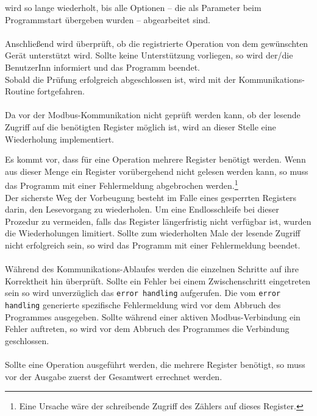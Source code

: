 \documentclass[Bachelorarbeit.tex]{subfiles}
\begin{document}
wird so lange wiederholt, bis alle Optionen – die als Parameter beim 
Programmstart übergeben wurden – abgearbeitet sind.\\
\\
Anschließend wird überprüft, ob die registrierte Operation von dem gewünschten 
Gerät unterstützt wird. Sollte keine Unterstützung vorliegen, so wird der/die 
BenutzerInn informiert und das Programm beendet.\\
Sobald die Prüfung 
erfolgreich abgeschlossen ist, wird mit der Kommunikations-Routine fortgefahren. \\
\\
Da vor der Modbus-Kommunikation nicht geprüft werden kann, ob der lesende Zugriff auf die benötigten Register möglich ist, wird an dieser Stelle eine Wiederholung implementiert.
\\
\begin{comment}
Es kommt vor, dass für eine Operation mehrere Register  –  zum Beispiel Register 28, 29, 32 und 33  –  benötigt werden.
\end{comment}
Es kommt vor, dass für eine Operation mehrere Register benötigt werden. 
Wenn aus dieser Menge ein  Register  vorübergehend nicht  gelesen  werden  kann,  so  muss  das 
Programm  mit  einer  Fehlermeldung  abgebrochen werden.\footnote{Eine Ursache wäre der schreibende Zugriff des Zählers auf dieses Register.}  \\
Der sicherste Weg  der  Vorbeugung  besteht  im  Falle  eines  gesperrten 
Registers  darin,  den  Lesevorgang  zu  wiederholen.  Um  eine
Endlosschleife  bei  dieser  Prozedur  zu  vermeiden,  falls das
Register  längerfristig  nicht  verfügbar  ist,  wurden  die  Wiederholungen 
limitiert.  
Sollte  zum  wiederholten  Male  der  lesende Zugriff  nicht erfolgreich sein, so wird das Programm mit einer Fehlermeldung beendet.\\
\\
Während des Kommunikations-Ablaufes werden die einzelnen Schritte auf ihre Korrektheit hin überprüft.
Sollte ein Fehler bei einem Zwischenschritt eingetreten sein so wird unverzüglich das \texttt{error handling} aufgerufen. 
Die vom \texttt{error handling} generierte spezifische Fehlermeldung wird vor dem Abbruch des Programmes ausgegeben.
Sollte während einer aktiven Modbus-Verbindung ein Fehler auftreten, so wird vor dem Abbruch des Programmes die Verbindung geschlossen.\\
\\
Sollte eine Operation ausgeführt werden, die mehrere Register benötigt, so muss vor der Ausgabe zuerst der Gesamtwert errechnet werden. 
\end{document}
